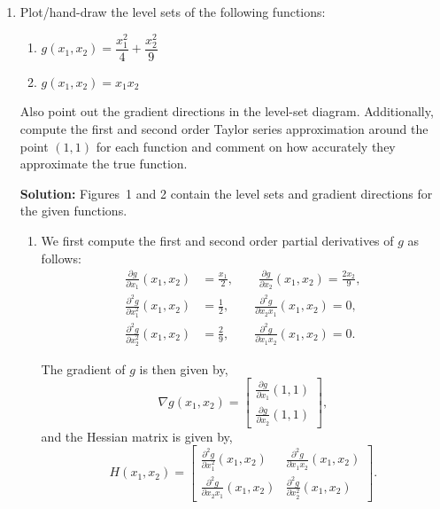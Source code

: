 \documentclass[10pt]{article}
\theoremstyle{definition}
\theoremstyle{plain}
\begin{document}
\begin{enumerate}[label=(\alph*)]
Consider the case now where all vectors and matrices above are scalar; do your answers above make sense? (No need to answer this in your submission.)

\item Plot/hand-draw the level sets of the following functions:
\begin{enumerate}[label=\roman*.]
    \item $g(x_1, x_2) = \dfrac{x_1^2}{4} + \dfrac{x_2^2}{9}$
    \item $g(x_1, x_2) = x_1 x_2$
\end{enumerate}

Also point out the gradient directions in the level-set diagram. Additionally, compute the first and second order Taylor series approximation around the point $(1,1)$ for each function and comment on how accurately they approximate the true function.

\textbf{Solution:} Figures~1 and 2 contain the level sets and gradient directions for the given functions.

\begin{enumerate}[label=\roman*.]
    \item We first compute the first and second order partial derivatives of $g$ as follows:
    \begin{align}
    \frac{\partial g}{\partial x_1}(x_1, x_2) &= \frac{x_1}{2}, \qquad \frac{\partial g}{\partial x_2}(x_1, x_2) = \frac{2x_2}{9}, \\
    \frac{\partial^2 g}{\partial x_1^2}(x_1, x_2) &= \frac{1}{2}, \qquad \frac{\partial^2 g}{\partial x_2 x_1}(x_1, x_2) = 0, \\
    \frac{\partial^2 g}{\partial x_2^2}(x_1, x_2) &= \frac{2}{9}, \qquad \frac{\partial^2 g}{\partial x_1 x_2}(x_1, x_2) = 0.
    \end{align}

    The gradient of $g$ is then given by,
    \begin{equation}
    \nabla g(x_1, x_2) = \begin{bmatrix} \frac{\partial g}{\partial x_1}(1,1) \\[4pt] \frac{\partial g}{\partial x_2}(1,1) \end{bmatrix},
    \end{equation}
    and the Hessian matrix is given by,
    \begin{equation}
    H(x_1, x_2) = \begin{bmatrix} \frac{\partial^2 g}{\partial x_1^2}(x_1, x_2) & \frac{\partial^2 g}{\partial x_1 x_2}(x_1, x_2) \\[4pt] \frac{\partial^2 g}{\partial x_2 x_1}(x_1, x_2) & \frac{\partial^2 g}{\partial x_2^2}(x_1, x_2) \end{bmatrix}.
    \end{equation}


\end{enumerate}
\end{enumerate}
\end{document}
